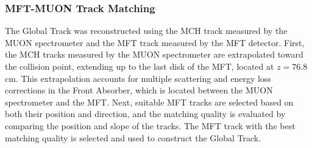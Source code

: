         \subsubsection{MFT-MUON Track Matching}\label{MFT-MUON_matching}
            The Global Track was reconstructed using the MCH track measured by the MUON spectrometer and the MFT track measured by the MFT detector. First, the MCH tracks measured by the MUON spectrometer are extrapolated toward the collision point, extending up to the last disk of the MFT, located at $z = 76.8$ cm. This extrapolation accounts for multiple scattering and energy loss corrections in the Front Absorber, which is located between the MUON spectrometer and the MFT. Next, suitable MFT tracks are selected based on both their position and direction, and the matching quality is evaluated by comparing the position and slope of the tracks. The MFT track with the best matching quality is selected and used to construct the Global Track.
